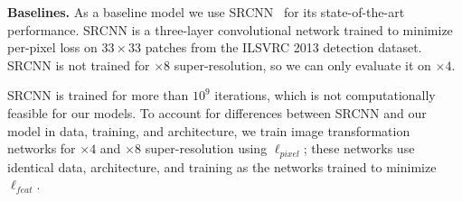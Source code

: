 \documentclass[runningheads]{llncs}
\begin{document}
\vspace{1mm}
\noindent \textbf{Baselines.}
As a baseline model we use SRCNN~\cite{dong2015image} for its state-of-the-art performance. SRCNN
is a three-layer convolutional network trained to minimize per-pixel loss on $33\times33$
patches from the ILSVRC 2013 detection dataset. SRCNN is not trained for $\times8$ super-resolution,
so we can only evaluate it on $\times4$.

SRCNN is trained for more than $10^9$ iterations, which is not computationally feasible for our
models. To account for differences between SRCNN and our model in data, training, and architecture,
we train image transformation networks for $\times4$ and $\times8$ super-resolution using
$\ell_{pixel}$; these networks use identical data, architecture, and training as the networks trained
to minimize $\ell_{feat}$.


\end{document}
